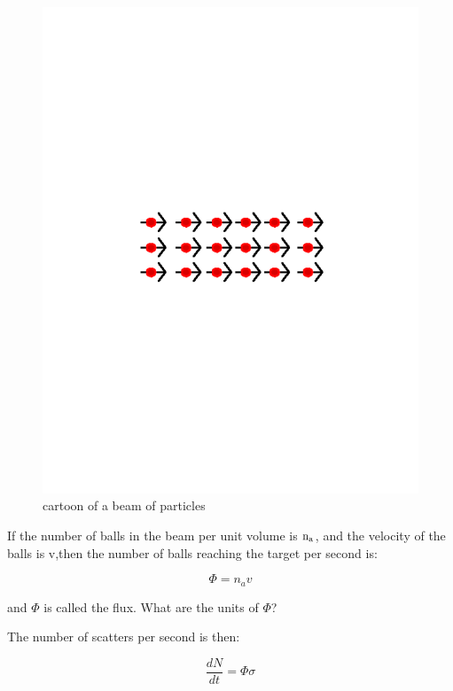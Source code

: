 \begin{figure}[h]
\centering\includegraphics[scale=0.5]{./protonprotoncollisions/Pictures/beam.pdf}
\caption{cartoon of a beam of particles}
\label{fig:beam}
\end{figure}



If the number of balls in the beam per unit volume is ${\rm n_a}$, 
and the velocity of the balls is v,then the number of balls reaching the target per second is:

\begin{equation}\Phi = n_{a}v\end{equation}

and \(\Phi\) is called the flux.  What are the units of \(\Phi\)?

The number of scatters per second is then:

\begin{equation}\frac{dN}{dt}=\Phi \sigma
\end{equation}

